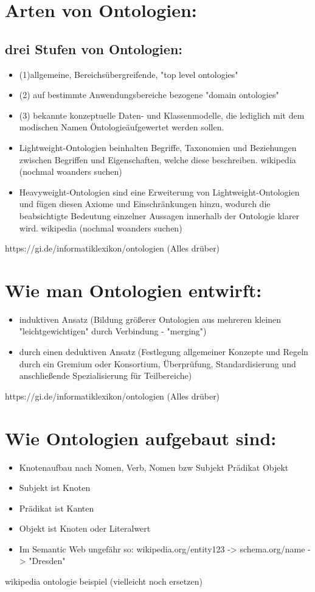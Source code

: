\section*{Arten von Ontologien:}
\subsection*{drei Stufen von Ontologien:}
	\begin{itemize}
		\item (1)allgemeine, Bereichsübergreifende, "top level ontologies"
		\item (2) auf bestimmte Anwendungsbereiche bezogene "domain ontologies" \item (3) bekannte konzeptuelle Daten- und Klassenmodelle, die lediglich mit dem modischen Namen \"Ontologie\" aufgewertet werden sollen.			
		\item Lightweight-Ontologien beinhalten Begriffe, Taxonomien und Beziehungen zwischen Begriffen und Eigenschaften, welche diese beschreiben.
		wikipedia (nochmal woanders suchen)
		\item Heavyweight-Ontologien sind eine Erweiterung von Lightweight-Ontologien und fügen diesen Axiome und Einschränkungen hinzu, wodurch die beabsichtigte Bedeutung einzelner Aussagen innerhalb der Ontologie klarer wird. 
		wikipedia (nochmal woanders suchen)
	\end{itemize}	
	https://gi.de/informatiklexikon/ontologien (Alles drüber)


\section*{Wie man Ontologien entwirft:}
\begin{itemize}
	\item	induktiven Ansatz (Bildung größerer Ontologien aus mehreren kleinen "leichtgewichtigen" durch Verbindung - "merging") 
	\item durch einen deduktiven Ansatz (Festlegung allgemeiner Konzepte und Regeln durch ein Gremium oder Konsortium, Überprüfung, Standardisierung und anschließende Spezialisierung für Teilbereiche) 
\end{itemize}
https://gi.de/informatiklexikon/ontologien (Alles drüber)

\section*{Wie Ontologien aufgebaut sind:}
\begin{itemize}
	\item Knotenaufbau nach Nomen, Verb, Nomen bzw Subjekt Prädikat Objekt
	\item Subjekt ist Knoten
	\item Prädikat ist Kanten
	\item Objekt ist Knoten oder Literalwert
	\item Im Semantic Web ungefähr so: 
				wikipedia.org/entity123 -> schema.org/name -> "Dresden"
\end{itemize}
wikipedia ontologie beispiel (vielleicht noch ersetzen)
